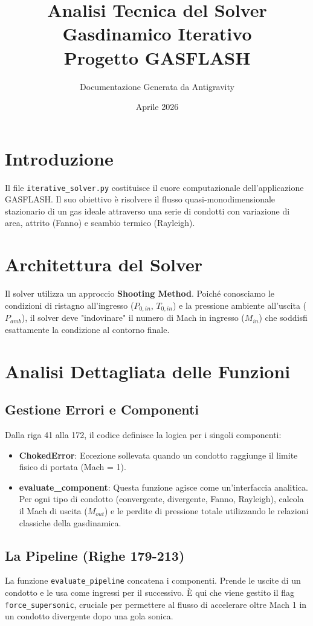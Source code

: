 \documentclass[11pt,a4paper]{article}
\title{Analisi Tecnica del Solver Gasdinamico Iterativo \\ \large Progetto GASFLASH}
\author{Documentazione Generata da Antigravity}
\date{Aprile 2026}
\begin{document}
\maketitle

\section{Introduzione}
Il file \texttt{iterative\_solver.py} costituisce il cuore computazionale dell'applicazione GASFLASH. Il suo obiettivo è risolvere il flusso quasi-monodimensionale stazionario di un gas ideale attraverso una serie di condotti con variazione di area, attrito (Fanno) e scambio termico (Rayleigh).

\section{Architettura del Solver}
Il solver utilizza un approccio \textbf{Shooting Method}. Poiché conosciamo le condizioni di ristagno all'ingresso ($P_{0,in}$, $T_{0,in}$) e la pressione ambiente all'uscita ($P_{amb}$), il solver deve "indovinare" il numero di Mach in ingresso ($M_{in}$) che soddisfi esattamente la condizione al contorno finale.

\section{Analisi Dettagliata delle Funzioni}

\subsection{Gestione Errori e Componenti}
Dalla riga 41 alla 172, il codice definisce la logica per i singoli componenti:
\begin{itemize}
    \item \textbf{ChokedError}: Eccezione sollevata quando un condotto raggiunge il limite fisico di portata (Mach = 1).
    \item \textbf{evaluate\_component}: Questa funzione agisce come un'interfaccia analitica. Per ogni tipo di condotto (convergente, divergente, Fanno, Rayleigh), calcola il Mach di uscita ($M_{out}$) e le perdite di pressione totale utilizzando le relazioni classiche della gasdinamica.
\end{itemize}

\subsection{La Pipeline (Righe 179-213)}
La funzione \texttt{evaluate\_pipeline} concatena i componenti. Prende le uscite di un condotto e le usa come ingressi per il successivo. È qui che viene gestito il flag \texttt{force\_supersonic}, cruciale per permettere al flusso di accelerare oltre Mach 1 in un condotto divergente dopo una gola sonica.
\end{document}
